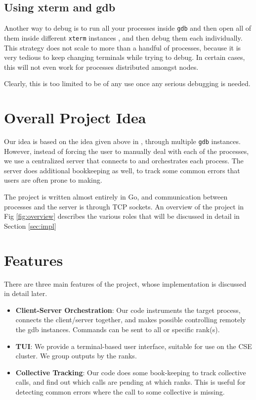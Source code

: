 \documentclass[10pt,conference]{IEEEtran}
\begin{document}
\subsection{Using xterm and gdb}

Another way to debug is to run all your processes inside \texttt{gdb} and then open all of them inside different \texttt{xterm} instances \cite{openmpidebug}, and then debug them each individually. This strategy does not scale to more than a handful of processes, because it is very tedious to keep changing terminals while trying to debug. In certain cases, this will not even work for processes distributed amongst nodes.

Clearly, this is too limited to be of any use once any serious debugging is needed.

\section{Overall Project Idea}

Our idea is based on the idea given above in \cite{openmpidebug}, through multiple \texttt{gdb} instances. However, instead of forcing the user to manually deal with each of the processes, we use a centralized server that connects to and orchestrates each process. The server does additional bookkeeping as well, to track some common errors that users are often prone to making.

The project is written almost entirely in Go, and communication between processes and the server is through TCP sockets. An overview of the project in Fig \ref{fig:overview} describes the various roles that will be discussed in detail in Section \ref{sec:impl}



\section{Features}

There are three main features of the project, whose implementation is discussed in detail later.

\begin{itemize}
\item \textbf{Client-Server Orchestration}: Our code instruments the target process, connects the client/server together, and makes possible controlling remotely the gdb instances. Commands can be sent to all or specific rank(s).
\item \textbf{TUI}: We provide a terminal-based user interface, suitable for use on the CSE cluster. We group outputs by the ranks.
\item \textbf{Collective Tracking}: Our code does some book-keeping to track collective calls, and find out which calls are pending at which ranks. This is useful for detecting common errors where the call to some collective is missing.
\end{itemize}
\end{document}
